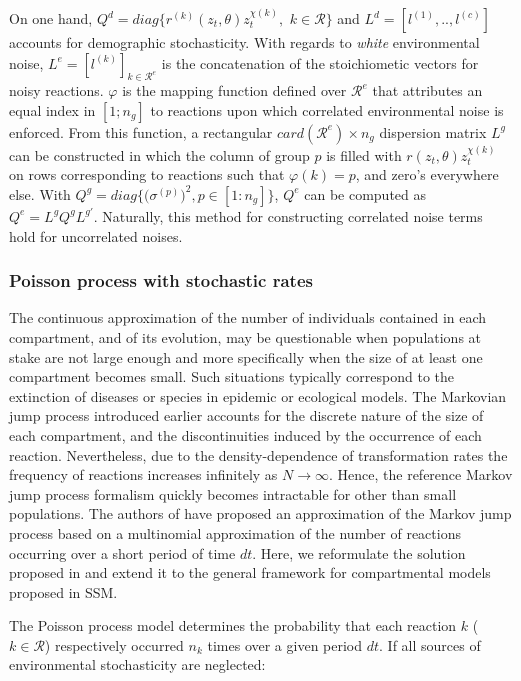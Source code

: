 \documentclass[a4paper,11pt,titlepage]{article}
\theoremstyle{plain} %
\begin{document}
On one hand, $Q^d = diag\{ r^{(k)}(z_t,\theta)z_t^{\chi(k)},$ $k\in \mathcal{R}\}$ and $L^d = [l^{(1)},..,l^{(c)}]$ accounts for demographic stochasticity. With regards to \emph{white} environmental noise, $L^e=[l^{(k)}]_{k\in\mathcal{R}^e}$ is the concatenation of the stoichiometic vectors for noisy reactions. $\varphi$ is the mapping function defined over $\mathcal{R}^e$ that attributes an equal index in $[1;n_g]$ to reactions upon which correlated environmental noise is enforced. From this function, a rectangular $card(\mathcal{R}^e)\times n_g$ dispersion matrix $L^g$ can be constructed in which the column of group $p$ is filled with $r(z_t,\theta)z_t^{\chi(k)}$ on rows corresponding to reactions such that $\varphi(k)=p$, and zero's everywhere else. With $Q^g=diag\big\{ \big(\sigma^{(p)})^2,p\in [1:n_g]\big\}$, $Q^e$ can be computed as $Q^e=L^g Q^g L^{g\prime}$. Naturally, this method for constructing correlated noise terms hold for uncorrelated noises.



\subsubsection{\label{subsub:psr}Poisson process with stochastic rates}


The continuous approximation of the number of individuals contained in each compartment, and of its evolution, may be questionable when populations at stake are not large enough and more specifically when the size of at least one compartment becomes small. Such situations typically correspond to the extinction of diseases or species in epidemic or ecological models. The Markovian jump process introduced earlier accounts for the discrete nature of the size of each compartment, and the discontinuities induced by the occurrence of each reaction. Nevertheless, due to the density-dependence of transformation rates the frequency of reactions increases infinitely as $N\rightarrow\infty$. Hence, the reference Markov jump process formalism quickly becomes intractable for other than small populations. The authors of \cite{Breto2009} have proposed an approximation of the Markov jump process based on a multinomial approximation of the number of reactions occurring over a short period of time $dt$. Here, we reformulate the solution proposed in \cite{Breto2009} and extend it to the general framework for compartmental models proposed in SSM. 


The Poisson process model determines the probability that each reaction $k$ ($k\in\mathcal{R}$) respectively occurred $n_k$ times over a given period $dt$. If all sources of environmental stochasticity are neglected:
\end{document}

